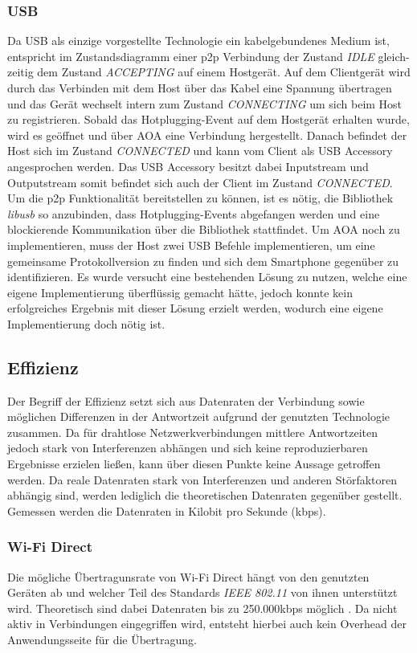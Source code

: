      \subsubsection{USB} Da USB als einzige vorgestellte Technologie ein kabelgebundenes Medium ist, \linebreak entspricht im Zustandsdiagramm einer p2p Verbindung der Zustand {\it IDLE} gleich-zeitig dem Zustand {\it ACCEPTING} auf einem Hostgerät. Auf dem Clientgerät wird durch das Verbinden mit dem Host über das Kabel eine Spannung übertragen und das Gerät wechselt intern zum Zustand {\it CONNECTING} um sich beim Host zu registrieren. Sobald das Hotplugging-Event auf dem Hostgerät erhalten wurde, wird es geöffnet und über AOA eine Verbindung hergestellt. Danach befindet der Host sich im Zustand {\it CONNECTED} und kann vom Client als USB Accessory angesprochen werden. Das USB Accessory besitzt dabei Inputstream und Outputstream somit befindet sich auch der Client im Zustand {\it CONNECTED}.
     Um die p2p Funktionalität bereitstellen zu können, ist es nötig, die Bibliothek {\it libusb} so anzubinden, dass Hotplugging-Events abgefangen werden und eine blockierende Kommunikation über die Bibliothek stattfindet. Um AOA noch zu implementieren, muss der Host zwei USB Befehle implementieren, um eine gemeinsame Protokollversion zu finden und sich dem Smartphone gegenüber zu identifizieren. Es wurde versucht eine bestehenden Lösung zu nutzen, welche eine eigene Implementierung überflüssig gemacht hätte, jedoch konnte kein erfolgreiches Ergebnis mit dieser Lösung erzielt werden, wodurch eine eigene Implementierung doch nötig ist.
		
		\subsection{Effizienz}
	   Der Begriff der Effizienz setzt sich aus Datenraten der Verbindung sowie möglichen Differenzen in der Antwortzeit aufgrund der genutzten Technologie zusammen. Da für drahtlose Netzwerkverbindungen mittlere Antwortzeiten jedoch stark von Interferenzen abhängen und sich keine reproduzierbaren Ergebnisse erzielen ließen, kann über diesen Punkte keine Aussage getroffen werden. Da reale Datenraten stark von Interferenzen und anderen Störfaktoren abhängig sind, werden lediglich die theoretischen Datenraten gegenüber gestellt. Gemessen werden die Datenraten in Kilobit pro Sekunde (kbps).

		\subsubsection{Wi-Fi Direct} Die mögliche Übertragunsrate von Wi-Fi Direct hängt von den genutzten Geräten ab und welcher Teil des Standards {\it IEEE 802.11} von ihnen unterstützt wird. Theoretisch sind dabei Datenraten bis zu 250.000kbps möglich \cite{wifiRate}. Da nicht aktiv in Verbindungen eingegriffen wird, entsteht hierbei auch kein Overhead der Anwendungsseite für die Übertragung.
		
